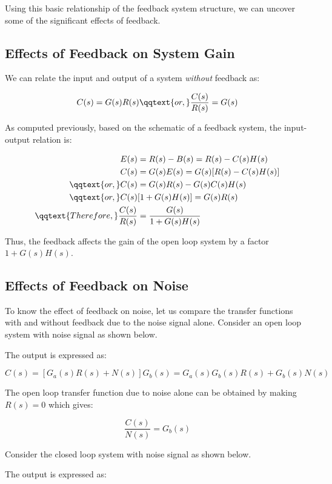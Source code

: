 \documentclass[
  14pt,
  a4paper,
  oneside,
  open=any,
  a4paper,
  14pt]{report}
\begin{document}
Using this basic relationship of the feedback system structure, we can
uncover some of the significant effects of feedback.

\subsection{Effects of Feedback on System
Gain}\label{effects-of-feedback-on-system-gain}

We can relate the input and output of a system \emph{without} feedback
as:

\[
    C(s) = G(s)R(s) \qqtext{or,} \dfrac{C(s)}{R(s)} = G(s)
\]

As computed previously, based on the schematic of a feedback system, the
input-output relation is:

\[
\begin{aligned}
    E(s) &= R(s) - B(s) = R(s) - C(s)H(s) \\
    C(s) &= G(s)E(s) = G(s)[R(s) - C(s)H(s)] \\
    \qqtext{or,} C(s) &= G(s)R(s) - G(s)C(s)H(s) \\
    \qqtext{or,} C(s)&[1+G(s)H(s)] = G(s)R(s) \\
    \qqtext{Therefore,} \dfrac{C(s)}{R(s)} &= \dfrac{G(s)}{1+G(s)H(s)}
\end{aligned}
\]

Thus, the feedback affects the gain of the open loop system by a factor
\(1+G(s)H(s)\).

\subsection{Effects of Feedback on
Noise}\label{effects-of-feedback-on-noise}

To know the effect of feedback on noise, let us compare the transfer
functions with and without feedback due to the noise signal alone.
Consider an open loop system with noise signal as shown below.

The output is expressed as:

\[
    C(s) = [G_a(s)R(s) + N(s)]G_b(s) = G_a(s)G_b(s)R(s) + G_b(s)N(s)
\]

The open loop transfer function due to noise alone can be obtained by
making \(R(s) = 0\) which gives:

\[
    \dfrac{C(s)}{N(s)} = G_b(s)
\]

Consider the closed loop system with noise signal as shown below.

The output is expressed as:
\end{document}
